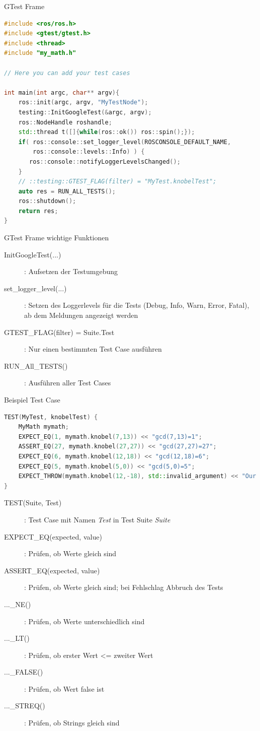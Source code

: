 \documentclass{beamer}
\begin{document}
\begin{frame}[fragile]{GTest Frame}
\begin{lstlisting}[language=c++]
#include <ros/ros.h>
#include <gtest/gtest.h>
#include <thread>
#include "my_math.h"

// Here you can add your test cases

int main(int argc, char** argv){
    ros::init(argc, argv, "MyTestNode");
    testing::InitGoogleTest(&argc, argv);
    ros::NodeHandle roshandle;
    std::thread t([]{while(ros::ok()) ros::spin();});
    if( ros::console::set_logger_level(ROSCONSOLE_DEFAULT_NAME, 
    	ros::console::levels::Info) ) {
       ros::console::notifyLoggerLevelsChanged();
    }
    // ::testing::GTEST_FLAG(filter) = "MyTest.knobelTest";
    auto res = RUN_ALL_TESTS();
    ros::shutdown();
    return res;
}
\end{lstlisting}
\end{frame}

\begin{frame}{GTest Frame wichtige Funktionen}
\begin{description}
	\item[InitGoogleTest(...)]: Aufsetzen der Testumgebung
	\item[set\_logger\_level(...)]: Setzen des Loggerlevels für die Tests (Debug, Info, Warn, Error, Fatal), ab dem Meldungen angezeigt werden
	\item[GTEST\_FLAG(filter) = Suite.Test]: Nur einen bestimmten Test Case ausführen
	\item[RUN\_All\_TESTS()]: Ausführen aller Test Cases
\end{description}
\end{frame}

\begin{frame}[fragile]{Beispiel Test Case}
\begin{lstlisting}[language=c++]
TEST(MyTest, knobelTest) {
    MyMath mymath;
    EXPECT_EQ(1, mymath.knobel(7,13)) << "gcd(7,13)=1";
    ASSERT_EQ(27, mymath.knobel(27,27)) << "gcd(27,27)=27";
    EXPECT_EQ(6, mymath.knobel(12,18)) << "gcd(12,18)=6";
    EXPECT_EQ(5, mymath.knobel(5,0)) << "gcd(5,0)=5";
    EXPECT_THROW(mymath.knobel(12,-18), std::invalid_argument) << "Our gcd isn't defined for negative values";
}
\end{lstlisting}
\pause
\begin{description}
	\item[TEST(Suite, Test)]: Test Case mit Namen \textit{Test} in Test Suite \textit{Suite}
	\item[EXPECT\_EQ(expected, value)]: Prüfen, ob Werte gleich sind
	\item[ASSERT\_EQ(expected, value)]: Prüfen, ob Werte gleich sind; bei Fehlschlag Abbruch des Tests
	\item[...\_NE()]: Prüfen, ob Werte unterschiedlich sind
	\item[...\_LT()]: Prüfen, ob erster Wert <= zweiter Wert
	\item[...\_FALSE()]: Prüfen, ob Wert false ist
	\item[...\_STREQ()]: Prüfen, ob Strings gleich sind
\end{description}
\end{frame}
\end{document}
